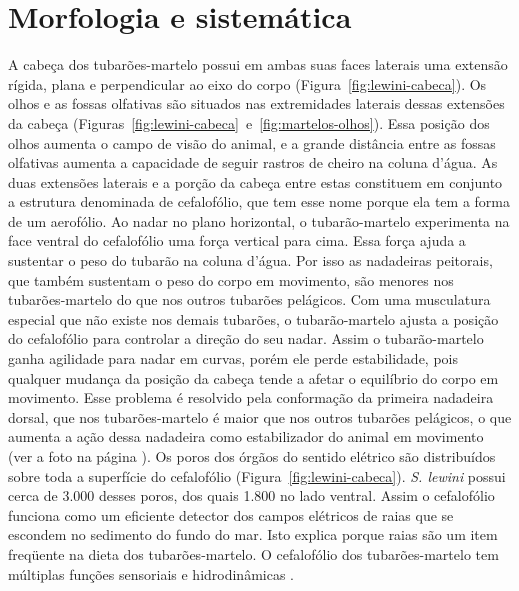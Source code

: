 \documentclass[a4paper,11pt,twoside,showtrims,onecolumn,openright,final]{memoir}
\begin{document}



\newpage

\section*{Morfologia e sistemática}

A cabeça dos tubarões-martelo possui em ambas suas faces laterais uma extensão rígida,  
plana e perpendicular ao eixo do corpo (Figura~\ref{fig:lewini-cabeca}). 
Os olhos e as fossas olfativas são situados nas extremidades 
laterais dessas extensões da cabeça (Figuras~\ref{fig:lewini-cabeca}~e~\ref{fig:martelos-olhos}). 
Essa posição dos olhos aumenta o campo de visão do animal, e a grande distância 
entre as fossas olfativas aumenta a capacidade de seguir rastros de cheiro na coluna d'água.
As duas extensões laterais e a porção da cabeça entre estas constituem em conjunto a 
estrutura denominada de cefalofólio, que tem esse nome porque ela tem a forma de um aerofólio. 
Ao nadar no plano horizontal, o  tubarão-martelo experimenta na face ventral do 
cefalofólio uma força vertical para cima. Essa força ajuda a sustentar o peso 
do tubarão na coluna d'água. Por isso as nadadeiras peitorais, que também sustentam 
o peso do corpo em movimento,  são menores nos tubarões-martelo do que nos outros tubarões 
pelágicos. Com uma musculatura especial que não existe nos demais tubarões, o tubarão-martelo 
ajusta a posição do cefalofólio para controlar a direção do seu nadar. Assim o tubarão-martelo 
ganha agilidade para nadar em curvas, porém ele perde estabilidade, pois qualquer mudança da 
posição da cabeça tende a afetar o equilíbrio do corpo em movimento. Esse problema é resolvido 
pela conformação da primeira nadadeira dorsal, que nos tubarões-martelo é maior que nos outros 
tubarões pelágicos, o que aumenta a ação dessa nadadeira como estabilizador do animal em movimento (ver a foto na página \pageref{chap:martelos}).
Os poros dos órgãos do sentido elétrico  são distribuídos sobre toda a superfície do cefalofólio (Figura~\ref{fig:lewini-cabeca}).
\emph{S. lewini} possui cerca de 3.000 desses poros, dos quais 1.800 no lado ventral. 
Assim o cefalofólio funciona como um eficiente detector dos campos elétricos de raias que se 
escondem no sedimento do fundo do mar. Isto explica porque raias são um item freqüente na dieta 
dos tubarões-martelo. O cefalofólio dos tubarões-martelo tem múltiplas funções sensoriais 
e hidrodinâmicas \citep{bigelow1948,alexander1975,nakaya1995,kajiura2001}. %
\end{document}
